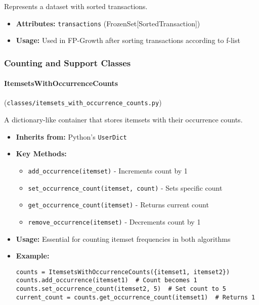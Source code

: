 \documentclass[
english,
smallborders
]{i6prcsht}
\begin{document}
Represents a dataset with sorted transactions.

\begin{itemize}
	\item \textbf{Attributes:} \texttt{transactions} (FrozenSet[SortedTransaction])
	\item \textbf{Usage:} Used in FP-Growth after sorting transactions according to f-list
\end{itemize}

\vspace*{0.3cm}

\vspace*{0.5cm}

\subsubsection*{Counting and Support Classes}

\paragraph{ItemsetsWithOccurrenceCounts} (\texttt{classes/itemsets\_with\_occurrence\_counts.py})

A dictionary-like container that stores itemsets with their occurrence counts.

\begin{itemize}
	\item \textbf{Inherits from:} Python's \texttt{UserDict}
	\item \textbf{Key Methods:}
	      \begin{itemize}
		      \item \texttt{add\_occurrence(itemset)} - Increments count by 1
		      \item \texttt{set\_occurrence\_count(itemset, count)} - Sets specific count
		      \item \texttt{get\_occurrence\_count(itemset)} - Returns current count
		      \item \texttt{remove\_occurrence(itemset)} - Decrements count by 1
	      \end{itemize}
	\item \textbf{Usage:} Essential for counting itemset frequencies in both algorithms
	\item \textbf{Example:}
	      \begin{lstlisting}
counts = ItemsetsWithOccurrenceCounts({itemset1, itemset2})
counts.add_occurrence(itemset1)  # Count becomes 1
counts.set_occurrence_count(itemset2, 5)  # Set count to 5
current_count = counts.get_occurrence_count(itemset1)  # Returns 1
    \end{lstlisting}
\end{itemize}
\end{document}
